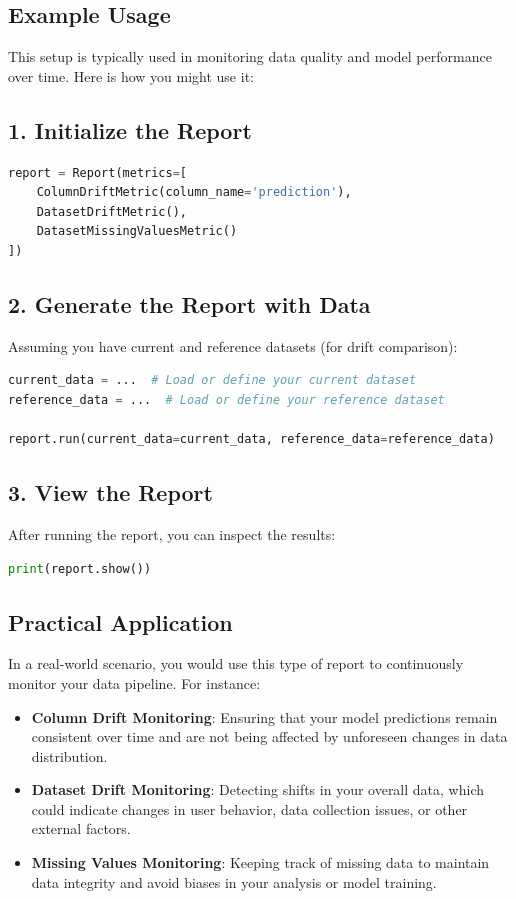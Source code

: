 \documentclass[letterpaper,12pt,notitlepage,twoside]{report}
\begin{document}
\subsection*{Example Usage}
This setup is typically used in monitoring data quality and model performance over time. Here is how you might use it:

\subsection*{1. Initialize the Report}
\begin{lstlisting}[language=python, numbers=none]
report = Report(metrics=[
    ColumnDriftMetric(column_name='prediction'),
    DatasetDriftMetric(),
    DatasetMissingValuesMetric()
])
\end{lstlisting}

\subsection*{2. Generate the Report with Data}
Assuming you have current and reference datasets (for drift comparison):
\begin{lstlisting}[language=python, numbers=none]
current_data = ...  # Load or define your current dataset
reference_data = ...  # Load or define your reference dataset

report.run(current_data=current_data, reference_data=reference_data)
\end{lstlisting}

\subsection*{3. View the Report}
After running the report, you can inspect the results:
\begin{lstlisting}[language=python, numbers=none]
print(report.show())
\end{lstlisting}

\subsection*{Practical Application}
In a real-world scenario, you would use this type of report to continuously monitor your data pipeline. For instance:
\begin{itemize}
    \item \textbf{Column Drift Monitoring}: Ensuring that your model predictions remain consistent over time and are not being affected by unforeseen changes in data distribution.
    \item \textbf{Dataset Drift Monitoring}: Detecting shifts in your overall data, which could indicate changes in user behavior, data collection issues, or other external factors.
    \item \textbf{Missing Values Monitoring}: Keeping track of missing data to maintain data integrity and avoid biases in your analysis or model training.
\end{itemize}
\end{document}
